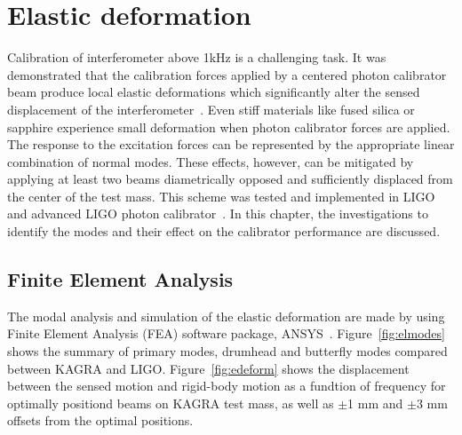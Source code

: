 
\chapter{Elastic deformation} %

\label{Chapter4} %
Calibration of interferometer above 1kHz is a challenging task. 
It was demonstrated that the calibration forces applied by a centered 
photon calibrator beam produce local elastic deformations which 
significantly alter the sensed displacement of the 
interferometer~\cite{Hild:2007,Goetz:2009}.
Even stiff materials like fused silica or sapphire experience small 
deformation when photon calibrator forces are applied. The response to 
the excitation forces can be represented by the appropriate linear 
combination of normal modes. These effects, however, can be mitigated 
by applying at least two beams diametrically opposed and sufficiently 
displaced from the center of the test mass. 
This scheme was tested and implemented in LIGO and advanced LIGO photon 
calibrator~\cite{Daveloza,Karki}.
In this chapter, the investigations to identify 
the modes and their effect on the calibrator performance are discussed.  


\section{Finite Element Analysis}
The modal analysis and simulation of the elastic deformation are made 
by using Finite Element Analysis (FEA) software package, ANSYS~\cite{ANSYS}.
Figure~\ref{fig:elmodes} shows the summary of primary modes, drumhead and 
butterfly modes compared between KAGRA and LIGO.
Figure~\ref{fig:edeform} shows the displacement between the sensed motion 
and rigid-body motion as a fundtion of frequency for optimally positiond 
beams on KAGRA test mass, as well as $\pm$1 mm and $\pm$3 mm offsets from 
the optimal positions.

